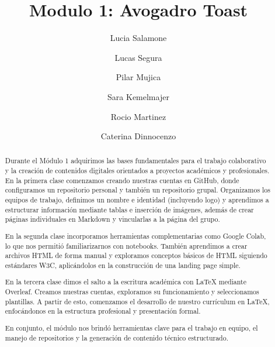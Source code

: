 \documentclass[runningheads]{llncs}
\begin{document}
%
\title{Modulo 1: Avogadro Toast}
%
%
\author{Lucia Salamone \and
Lucas Segura \and
Pilar Mujica\and
Sara Kemelmajer\and
Rocio Martinez\and
Caterina Dinnocenzo}
%
%
%
\maketitle              %
%
\begin{abstract}
Durante el Módulo 1 adquirimos las bases fundamentales para el trabajo colaborativo y la creación de contenidos digitales orientados a proyectos académicos y profesionales. En la primera clase comenzamos creando nuestras cuentas en GitHub, donde configuramos un repositorio personal y también un repositorio grupal. Organizamos los equipos de trabajo, definimos un nombre e identidad (incluyendo logo) y aprendimos a estructurar información mediante tablas e inserción de imágenes, además de crear páginas individuales en Markdown y vincularlas a la página del grupo.

En la segunda clase incorporamos herramientas complementarias como Google Colab, lo \cite{lopez2003latex}que nos permitió familiarizarnos con notebooks. También aprendimos a crear archivos HTML de forma manual y exploramos conceptos básicos de HTML siguiendo estándares W3C, aplicándolos en la construcción de una landing page simple.

En la tercera clase dimos \cite{sepulcre2024uso}el salto a la escritura académica con LaTeX mediante Overleaf. Creamos nuestras cuentas, exploramos su funcionamiento y seleccionamos plantillas. A partir de esto, comenzamos el desarrollo de nuestro currículum en LaTeX, enfocándonos en la estructura profesional y presentación formal.

En conjunto, el módulo nos brindó herramientas clave para el trabajo en equipo, el manejo de repositorios y la generación de contenido técnico estructurado.


\end{abstract}
%
%
%
\end{document}
